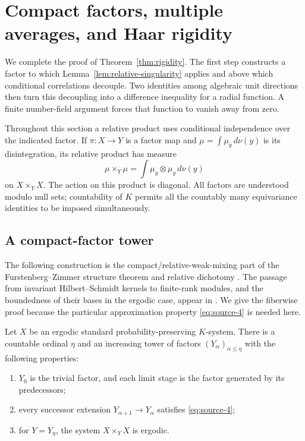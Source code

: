 \section{Compact factors, multiple averages, and Haar rigidity}
\label{sec:rigidity}

We complete the proof of Theorem~\ref{thm:rigidity}.  The first step
constructs a factor to which Lemma~\ref{lem:relative-singularity} applies
and above which conditional correlations decouple.  Two identities among
algebraic unit directions then turn this decoupling into a difference
inequality for a radial function.  A finite number-field argument forces
that function to vanish away from zero.

Throughout this section a relative product uses conditional independence
over the indicated factor.  If $\pi:X\to Y$ is a factor map and
$\mu=\int\mu_y\,d\nu(y)$ is its disintegration, its relative product has
measure
\[
 \mu\mathbin{\times_Y}\mu
   =\int \mu_y\otimes\mu_y\,d\nu(y)
\]
on $X\times_YX$.  The action on this product is diagonal.  All factors
are understood modulo null sets; countability of $K$ permits all the
countably many equivariance identities to be imposed simultaneously.

\subsection{A compact-factor tower}

The following construction is the compact/relative-weak-mixing part of
the Furstenberg--Zimmer structure theorem and relative dichotomy
\citep{Furstenberg1977,ZimmerExtensions1976,ZimmerDiscrete1976,
JamneshanStructure,JamneshanCorrigendum}. The passage from invariant
Hilbert--Schmidt kernels to finite-rank modules, and the boundedness
of their bases in the ergodic case, appear in
\citet[Lemmas~6.6 and~7.2]{Furstenberg1977}. We give the fiberwise
proof because the particular approximation property
\eqref{eq:source-4} is needed here.

\begin{lemma}\label{lem:compact-tower}
Let $X$ be an ergodic standard probability-preserving $K$-system.
There is a countable ordinal $\eta$ and an increasing tower of factors
$(Y_\alpha)_{\alpha\leq\eta}$ with the following properties:
\begin{enumerate}
\item $Y_0$ is the trivial factor, and each limit stage is the factor
generated by its predecessors;
\item every successor extension $Y_{\alpha+1}\to Y_\alpha$ satisfies
\eqref{eq:source-4};
\item for $Y=Y_\eta$, the system $X\times_YX$ is ergodic.
\end{enumerate}
\end{lemma}

